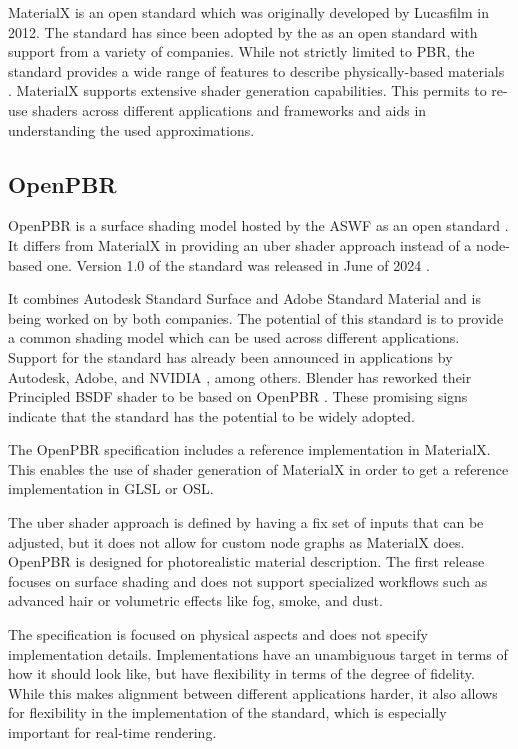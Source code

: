 \gls{MaterialX} is an open standard which was originally developed by Lucasfilm in 2012. The standard has since been adopted by the  as an open standard with support from a variety of companies. While not strictly limited to \gls{PBR}, the standard provides a wide range of features to describe physically-based materials \cite{Harrysson2019}. \gls{MaterialX} supports extensive shader generation capabilities. This permits to re-use shaders across different applications and frameworks and aids in understanding the used approximations.

\subsection*{OpenPBR}

\gls{OpenPBR} is a surface shading model hosted by the \gls{ASWF} as an open standard \cite{openPBRSpec}. It differs from \gls{MaterialX} in providing an \gls{uber shader} approach instead of a node-based one. Version 1.0 of the standard was released in June of 2024 \cite{openPBR1Dot0Release}.

It combines Autodesk Standard Surface and Adobe Standard Material and is being worked on by both companies. The potential of this standard is to provide a common shading model which can be used across different applications. Support for the standard has already been announced in applications by Autodesk, Adobe, and NVIDIA \cite{omniverseOpenPBR}, among others. \gls{Blender} has reworked their Principled \gls{BSDF} shader to be based on \gls{OpenPBR} \cite{blenderOpenPBRInspiration}. These promising signs indicate that the standard has the potential to be widely adopted.

The \gls{OpenPBR} specification includes a reference implementation in \gls{MaterialX}. This enables the use of shader generation of \gls{MaterialX} in order to get a reference implementation in \gls{GLSL} or \gls{OSL}.

The \gls{uber shader} approach is defined by having a fix set of inputs that can be adjusted, but it does not allow for custom node graphs as \gls{MaterialX} does. \gls{OpenPBR} is designed for photorealistic material description. The first release focuses on surface shading and does not support specialized workflows such as advanced hair or volumetric effects like fog, smoke, and dust.

The specification is focused on physical aspects and does not specify implementation details. Implementations have an unambiguous target in terms of how it should look like, but have flexibility in terms of the degree of fidelity. While this makes alignment between different applications harder, it also allows for flexibility in the implementation of the standard, which is especially important for real-time rendering.

